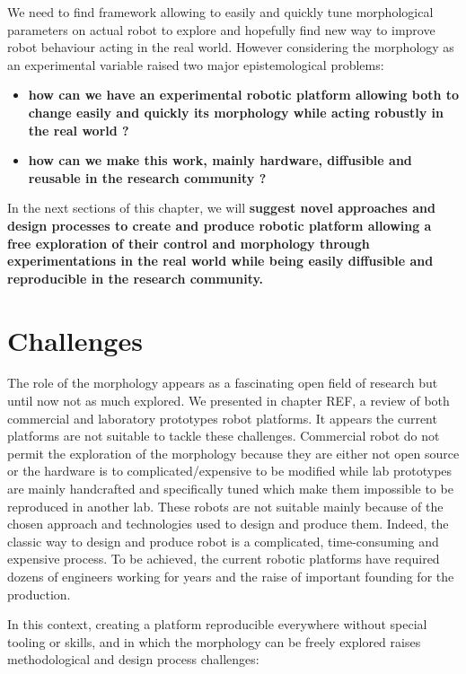 We need to find framework allowing to easily and quickly tune morphological parameters on actual robot to explore and hopefully find new way to improve robot behaviour acting in the real world. However considering the morphology as an experimental variable raised two major epistemological problems:
\begin{itemize}
    \item \textbf{how can we have an experimental robotic platform allowing both to change easily and quickly its morphology while acting robustly in the real world ? }
    \item \textbf{how can we make this work, mainly hardware, diffusible and reusable in the research community ? }
\end{itemize}

In the next sections of this chapter, we will \textbf{suggest novel approaches and design processes to create and produce robotic platform  allowing a free exploration of their control and morphology through experimentations in the real world while being easily diffusible and reproducible in the research community.}

\section{Challenges} %

The role of the morphology appears as a fascinating open field of research but until now not as much explored.
We presented in chapter REF, a review of both commercial and laboratory prototypes robot platforms. It appears the current platforms are not suitable to tackle these challenges. Commercial robot do not permit the exploration of the morphology because they are either not open source or the hardware is to complicated/expensive to be modified while lab prototypes are mainly handcrafted and specifically tuned which make them impossible to be reproduced in another lab. These robots are not suitable mainly because of the chosen approach and technologies used to design and produce them.
Indeed, the classic way to design and produce robot is a complicated, time-consuming and expensive process. To be achieved, the current robotic platforms have required dozens of engineers working for years and the raise of important founding for the production.

In this context, creating a platform reproducible everywhere without special tooling or skills, and in which the morphology can be freely explored raises methodological and design process challenges:

